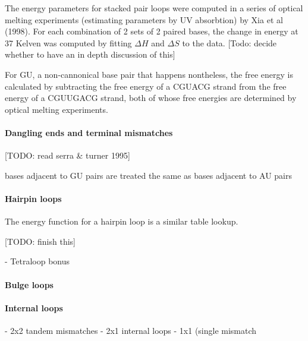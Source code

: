 The energy parameters for stacked pair loops were computed in a series
of optical melting experiments (estimating parameters by UV
absorbtion) by Xia et al (1998). For each combination of 2 sets of 2
paired bases, the change in energy at 37 Kelven was computed by
fitting $\Delta H$ and $\Delta S$ to the data. [Todo: decide whether
to have an in depth discussion of this]

For GU, a non-cannonical base pair that happens nontheless, the free
energy is calculated by subtracting the free energy of a CGUACG strand
from the free energy of a CGUUGACG strand, both of whose free energies
are determined by optical melting experiments.


\paragraph{Dangling ends and terminal mismatches}

[TODO: read serra & turner 1995]

bases adjacent to GU pairs are treated the same as bases adjacent to AU pairs

\paragraph{Hairpin loops}

The energy function for a hairpin loop is a similar table lookup.

[TODO: finish this]

- Tetraloop bonus

\paragraph{Bulge loops}

\paragraph{Internal loops}
- 2x2 tandem mismatches
- 2x1 internal loops
- 1x1 (single mismatch

